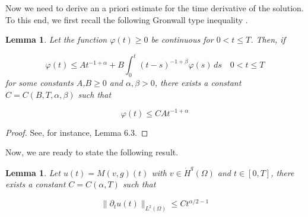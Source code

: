 \documentclass{amsart}
\newcommand{\phii}{\varphi}
\newcommand{\ele}{L^2(\Omega)}
\newcommand{\W}{\Omega}
\newcommand{\fmonio}{g}
\newtheorem{lemma}[theorem]{Lemma}
\theoremstyle{remark}
\theoremstyle{definition}
\numberwithin{equation}{section}
\begin{document}
Now we need to derive an a priori estimate for the time derivative of the solution. To this end, we first recall the following Gronwall type inequality . 


\begin{lemma}
\label{gronwall}
Let the function $\phii(t)\geq 0 $ be continuous for $0 < t \leq T$. Then, if

$$\phii(t) \leq At^{-1+\alpha} + B\int^t_0 (t-s)^{-1+\beta}\phii(s) \, ds \quad 0<t\leq T$$  
for some constants $A$,$B \geq 0$ and $\alpha, \beta > 0$, there exists a constant $C = C(B,T,\alpha,\beta)$ such that 

\begin{equation}
\label{eq:gronwall}
\phii(t) \leq CAt^{-1+\alpha}
\end{equation}
\end{lemma}
\begin{proof}
 See, for instance, \cite{elliott} Lemma 6.3.
\end{proof}
Now, we are ready to state the following result.
\begin{lemma}
\label{lem:estimacion_derivada}
Let $u(t) = M(v,\fmonio)(t)$ with $v \in \dot{H}^{q}(\W)$ and $t \in [0,T]$, there exists a constant $C = C(\alpha,T)$ such that 

\begin{equation}
\label{eq:estimacion_derivada}
   \|\partial_t u(t)\|_{\ele} \leq C t^{\alpha/2 - 1}
\end{equation}

\end{lemma}   
\end{document}
